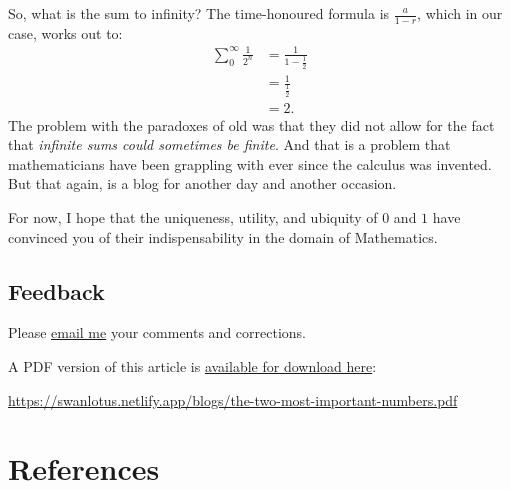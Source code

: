 \documentclass[
  a4paper,
]{article}
\begin{document}
So, what is the sum to infinity? The time-honoured formula is
\(\frac{a}{1-r}\), which in our case, works out to: \[
\begin{aligned}
\sum_{0}^{\infty} \frac{1}{2^n} &= \frac{1}{1-\frac{1}{2}}\\
&= \frac{1}{\frac{1}{2}}\\
&= 2.
\end{aligned}
\] The problem with the paradoxes of old was that they did not allow for
the fact that \emph{infinite sums could sometimes be finite}. And that
is a problem that mathematicians have been grappling with ever since the
calculus was invented. But that again, is a blog for another day and
another occasion.

For now, I hope that the uniqueness, utility, and ubiquity of \(0\) and
\(1\) have convinced you of their indispensability in the domain of
Mathematics.

\subsection{Feedback}\label{feedback}

Please \href{mailto:feedback.swanlotus@gmail.com}{email me} your
comments and corrections.

\noindent A PDF version of this article is
\href{./the-two-most-important-numbers.pdf}{available for download
here}:

\begin{small}

\begin{sffamily}

\url{https://swanlotus.netlify.app/blogs/the-two-most-important-numbers.pdf}

\end{sffamily}

\end{small}

\section*{References}\label{bibliography}
\end{document}
